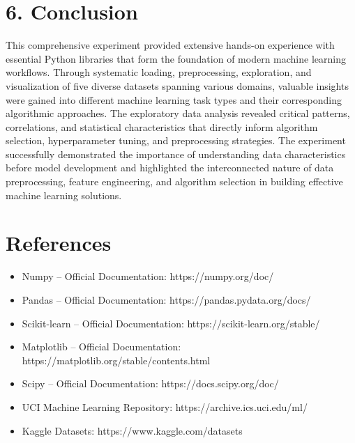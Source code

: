\documentclass[11pt]{article}
\begin{document}
\section*{6. Conclusion}
This comprehensive experiment provided extensive hands-on experience with essential Python libraries that form the foundation of modern machine learning workflows. Through systematic loading, preprocessing, exploration, and visualization of five diverse datasets spanning various domains, valuable insights were gained into different machine learning task types and their corresponding algorithmic approaches. The exploratory data analysis revealed critical patterns, correlations, and statistical characteristics that directly inform algorithm selection, hyperparameter tuning, and preprocessing strategies. The experiment successfully demonstrated the importance of understanding data characteristics before model development and highlighted the interconnected nature of data preprocessing, feature engineering, and algorithm selection in building effective machine learning solutions.

\section*{References}
\begin{itemize}
\item Numpy – Official Documentation: https://numpy.org/doc/
\item Pandas – Official Documentation: https://pandas.pydata.org/docs/
\item Scikit-learn – Official Documentation: https://scikit-learn.org/stable/
\item Matplotlib – Official Documentation: https://matplotlib.org/stable/contents.html
\item Scipy – Official Documentation: https://docs.scipy.org/doc/
\item UCI Machine Learning Repository: https://archive.ics.uci.edu/ml/
\item Kaggle Datasets: https://www.kaggle.com/datasets
\end{itemize}
\end{document}
